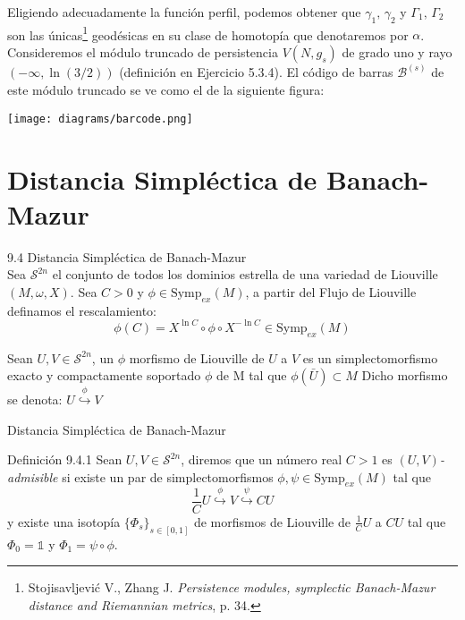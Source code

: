 \documentclass{beamer}
\newcounter{Ejercicio}
\begin{document}
\begin{frame}
Eligiendo adecuadamente la funci\'on perfil, podemos obtener que $\gamma_1,\,\gamma_2$ y $\Gamma_1,\,\Gamma_2$ son las \'unicas\footnote{Stojisavljević V., Zhang J. \emph{Persistence modules, symplectic Banach-Mazur distance and Riemannian metrics}, p. 34.} geod\'esicas en su clase de homotop\'ia que denotaremos por $\alpha$.\\
\vspace{1em}
Consideremos el m\'odulo truncado de persistencia $V(N,g_s)$ de grado uno y rayo $(-\infty,\ln (3/2))$ (definici\'on en Ejercicio 5.3.4). El c\'odigo de barras $\mathcal{B}^{(s)}$ de este m\'odulo truncado se ve como el de la siguiente figura:
\begin{center}
\texttt{[image: diagrams/barcode.png]}
\end{center}
\end{frame}

\section{Distancia Simpl\'ectica de Banach-Mazur}

\begin{frame}{9.4 Distancia Simpl\'ectica de Banach-Mazur}
\scalebox{0.6}{Onjetivo: Definir una pseudom\'etrica entre dominios estrella.}\\
\vspace{1em}
Sea $\mathcal{S}^{2n}$ el conjunto de todos los dominios estrella de una variedad de Liouville $(M,\omega,X)$. Sea $C>0$ y $\phi\in\mbox{Symp}_{ex}(M)$, a partir del Flujo de Liouville definamos el rescalamiento:
$$\phi(C)=X^{\ln C}\circ \phi \circ X^{-\ln C}\in \mbox{Symp}_{ex}(M)$$

Sean $U,V\in \mathcal{S}^{2n}$, un $\phi$ morfismo de Liouville de $U$ a $V$ es un simplectomorfismo exacto y compactamente soportado $\phi$ de M tal que $\phi(\bar{U})\subset M$
\vspace{1em}
Dicho morfismo se denota: $U  \overset{\phi}{\hookrightarrow} V$
\end{frame}


\begin{frame}{Distancia Simpl\'ectica de Banach-Mazur}
\begin{block}{Definici\'on 9.4.1}
Sean $U,V\in \mathcal{S}^{2n}$, diremos que un n\'umero real $C>1$ es $(U,V)$\emph{-admisible} si existe un par de simplectomorfismos $\phi,\psi \in \mbox{Symp}_{ex}(M)$ tal que $$\frac{1}{C}U  \overset{\phi}{\hookrightarrow} V  \overset{\psi}{\hookrightarrow} CU$$
y existe una isotop\'ia $\{\Phi_s\}_{s\in[0,1]}$ de morfismos de Liouville de $\frac{1}{C}U$ a $CU$ tal que $\Phi_0=\mathbb{1}$ y $\Phi_{1}=\psi\circ \phi$.
\end{block}

\end{frame}
\end{document}
